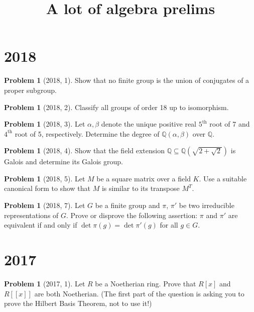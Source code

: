 \documentclass{article}
\newcommand{\<}{\langle} %
\renewcommand{\>}{\rangle} %
\theoremstyle{plain}
\theoremstyle{remark}
\theoremstyle{definition}
\newcounter{question}
\newtheorem{examproblem}[equation]{Problem}
\begin{document}
\title{A lot of algebra prelims}
\date{}
\author{}


\maketitle
\tableofcontents

\pagebreak

\section{2018}
\begin{examproblem}[2018, 1]
	Show that no finite group is the union of conjugates of a proper subgroup.
\end{examproblem}

\begin{examproblem}[2018, 2]
	Classify all groups of order 18 up to isomorphism.
\end{examproblem}

\begin{examproblem}[2018, 3]
	Let $\alpha,\beta$ denote the unique positive
	real $5^{\text{th}}$ root of 7 and $4^{\text{th}}$ root of 5,
	respectively. Determine the degree of $\mathbb Q(\alpha,\beta)$ over $\mathbb Q$.
\end{examproblem}

\begin{examproblem}[2018, 4]
	Show that the field extension $\mathbb Q\subseteq\mathbb Q\left(
	\sqrt{2+\sqrt2}\right)$ is Galois and determine its Galois group.
\end{examproblem}

\begin{examproblem}[2018, 5]
	Let $M$ be a square matrix over a field $K$. Use a suitable canonical
	form to show that $M$ is similar to its transpose $M^T$.
\end{examproblem}



\begin{examproblem}[2018, 7]
	Let $G$ be a finite group and $\pi$, $\pi'$ be two irreducible
	representations of $G$. Prove or disprove the following assertion:
	$\pi$ and $\pi'$ are equivalent if and only if $\det\pi(g)=\det\pi'(g)$
	for all $g\in G$.
\end{examproblem}

\pagebreak
\section{2017}
\begin{examproblem}[2017, 1]
	Let $R$ be a Noetherian ring. Prove that $R[x]$ and $R[[x]]$ are both
	Noetherian. (The first part of the question is asking you to prove the
	Hilbert Basis Theorem, not to use it!)
\end{examproblem}
\end{document}
